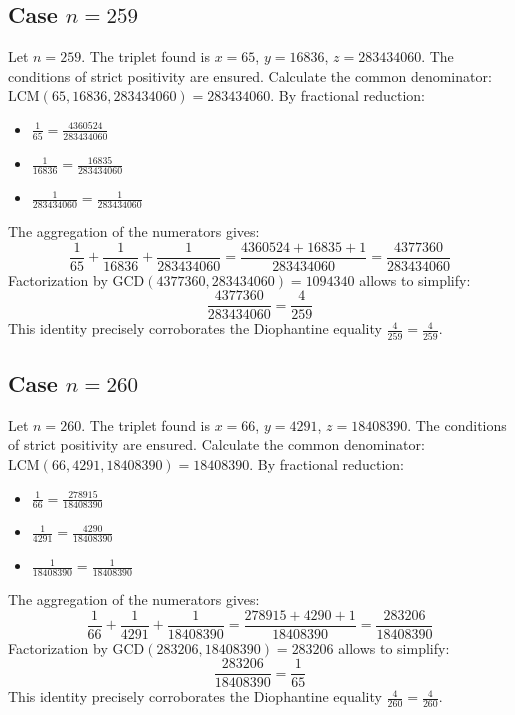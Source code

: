 \documentclass[11pt,a4paper]{article}
\begin{document}
\subsection{Case $n = 259$}
Let $n = 259$. The triplet found is $x = 65$, $y = 16836$, $z = 283434060$.
The conditions of strict positivity are ensured.
Calculate the common denominator: $\text{LCM}(65, 16836, 283434060) = 283434060$.
By fractional reduction:
\begin{itemize}
    \item $\frac{1}{65} = \frac{4360524}{283434060}$
    \item $\frac{1}{16836} = \frac{16835}{283434060}$
    \item $\frac{1}{283434060} = \frac{1}{283434060}$
\end{itemize}
The aggregation of the numerators gives:
$$ \frac{1}{65} + \frac{1}{16836} + \frac{1}{283434060} = \frac{4360524 + 16835 + 1}{283434060} = \frac{4377360}{283434060} $$
Factorization by $\text{GCD}(4377360, 283434060) = 1094340$ allows to simplify:
$$ \frac{4377360}{283434060} = \frac{4}{259} $$
This identity precisely corroborates the Diophantine equality $\frac{4}{259} = \frac{4}{259}$.

\subsection{Case $n = 260$}
Let $n = 260$. The triplet found is $x = 66$, $y = 4291$, $z = 18408390$.
The conditions of strict positivity are ensured.
Calculate the common denominator: $\text{LCM}(66, 4291, 18408390) = 18408390$.
By fractional reduction:
\begin{itemize}
    \item $\frac{1}{66} = \frac{278915}{18408390}$
    \item $\frac{1}{4291} = \frac{4290}{18408390}$
    \item $\frac{1}{18408390} = \frac{1}{18408390}$
\end{itemize}
The aggregation of the numerators gives:
$$ \frac{1}{66} + \frac{1}{4291} + \frac{1}{18408390} = \frac{278915 + 4290 + 1}{18408390} = \frac{283206}{18408390} $$
Factorization by $\text{GCD}(283206, 18408390) = 283206$ allows to simplify:
$$ \frac{283206}{18408390} = \frac{1}{65} $$
This identity precisely corroborates the Diophantine equality $\frac{4}{260} = \frac{4}{260}$.
\end{document}
